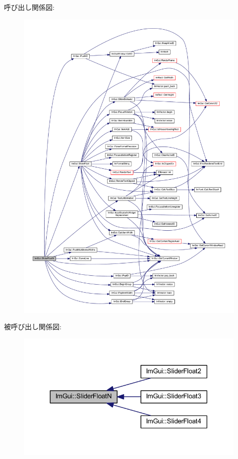 呼び出し関係図\+:\nopagebreak
\begin{figure}[H]
\begin{center}
\leavevmode
\includegraphics[width=350pt]{namespace_im_gui_a3ffffbdfe59f18a2321dd1cb39dfb6e1_cgraph}
\end{center}
\end{figure}
被呼び出し関係図\+:\nopagebreak
\begin{figure}[H]
\begin{center}
\leavevmode
\includegraphics[width=317pt]{namespace_im_gui_a3ffffbdfe59f18a2321dd1cb39dfb6e1_icgraph}
\end{center}
\end{figure}
\mbox{\label{namespace_im_gui_adfa3869210878bbf2c92c3c9383534f5}} 

